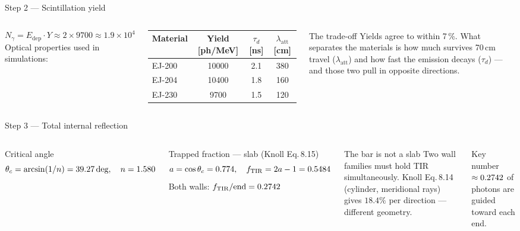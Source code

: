 \documentclass[aspectratio=169,9pt]{beamer}
\newcommand{\thetac}{\theta_c}
\newcommand{\fTIR}{f_{\mathrm{TIR}}}
\newcommand{\latt}{\lambda_{\mathrm{att}}}
\begin{document}
\begin{frame}{Step 2 — Scintillation yield}
  \begin{columns}[T]
      \[N_\gamma = E_{\mathrm{dep}}\cdot Y \approx 2\times 9700 \approx 1.9\times10^4\]
      {\small Optical properties used in simulations:}\\[4pt]
      {\footnotesize
      \setlength{\tabcolsep}{5pt}
      \begin{tabular}{@{}lccc@{}}
        \toprule
        Material & Yield [ph/MeV] & $\tau_d$ [ns] & $\latt$ [cm]\\
        \midrule
        EJ-200 & 10000 & 2.1 & 380\\
        EJ-204 & 10400 & 1.8 & 160\\
        EJ-230 & 9700  & 1.5 & 120\\
        \bottomrule
      \end{tabular}}
      \begin{block}{The trade-off}
        {\small Yields agree to within 7\,\%.  What separates the materials
        is how much survives 70\,cm travel ($\latt$) and how fast
        the emission decays ($\tau_d$) — and those two pull in opposite directions.}
      \end{block}
  \end{columns}
\end{frame}

\begin{frame}{Step 3 — Total internal reflection}
  \begin{columns}[T]
      \begin{block}{Critical angle}
        \[
          \thetac = \arcsin(1/n) = \Napthetacdeg,
          \quad n=\Napnpvt
        \]
      \end{block}
      \begin{block}{Trapped fraction — slab (Knoll Eq.\,8.15)}
        \[
          a = \cos\thetac = 0.774,\quad
          \fTIR = 2a - 1 = \NapfTIR
        \]
        Both walls: $\fTIR/\text{end} = \NapfTIRperend$
      \end{block}
      \begin{alertblock}{The bar is not a slab}
        {\small Two wall families must hold TIR simultaneously.
        Knoll Eq.\,8.14 (cylinder, meridional rays) gives $18.4\%$
        per direction — different geometry.}
      \end{alertblock}
      \begin{block}{Key number}
        {\small $\approx0.2742$ of photons are guided toward each end.}
      \end{block}
  \end{columns}
\end{frame}
\end{document}
